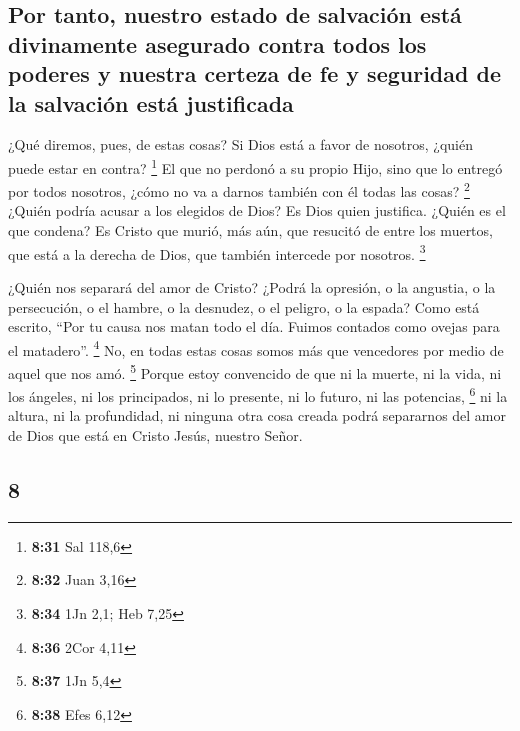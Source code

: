 \begin{paracol}{2}
\hypertarget{por-tanto-nuestro-estado-de-salvaciuxf3n-estuxe1-divinamente-asegurado-contra-todos-los-poderes-y-nuestra-certeza-de-fe-y-seguridad-de-la-salvaciuxf3n-estuxe1-justificada}{%
\subsection{Por tanto, nuestro estado de salvación está divinamente
asegurado contra todos los poderes y nuestra certeza de fe y seguridad
de la salvación está
justificada}\label{por-tanto-nuestro-estado-de-salvaciuxf3n-estuxe1-divinamente-asegurado-contra-todos-los-poderes-y-nuestra-certeza-de-fe-y-seguridad-de-la-salvaciuxf3n-estuxe1-justificada}}

 ¿Qué diremos, pues, de estas cosas? Si Dios está a favor
de nosotros, ¿quién puede estar en contra? \footnote{\textbf{8:31} Sal
  118,6}  El que no perdonó a su propio Hijo, sino que lo
entregó por todos nosotros, ¿cómo no va a darnos también con él todas
las cosas? \footnote{\textbf{8:32} Juan 3,16}  ¿Quién
podría acusar a los elegidos de Dios? Es Dios quien justifica.
 ¿Quién es el que condena? Es Cristo que murió, más aún,
que resucitó de entre los muertos, que está a la derecha de Dios, que
también intercede por nosotros. \footnote{\textbf{8:34} 1Jn 2,1; Heb
  7,25}

 ¿Quién nos separará del amor de Cristo? ¿Podrá la
opresión, o la angustia, o la persecución, o el hambre, o la desnudez, o
el peligro, o la espada?  Como está escrito, ``Por tu
causa nos matan todo el día. Fuimos contados como ovejas para el
matadero''. \footnote{\textbf{8:36} 2Cor 4,11}  No, en
todas estas cosas somos más que vencedores por medio de aquel que nos
amó. \footnote{\textbf{8:37} 1Jn 5,4}  Porque estoy
convencido de que ni la muerte, ni la vida, ni los ángeles, ni los
principados, ni lo presente, ni lo futuro, ni las potencias, \footnote{\textbf{8:38}
  Efes 6,12}  ni la altura, ni la profundidad, ni ninguna
otra cosa creada podrá separarnos del amor de Dios que está en Cristo
Jesús, nuestro Señor.

\switchcolumn
\begin{otherlanguage}{english}

\hypertarget{section-15}{%
\section{8}\label{section-15}}


\end{otherlanguage}
\end{paracol}
